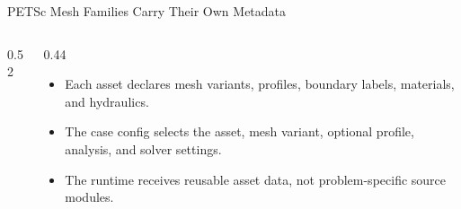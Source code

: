\documentclass[aspectratio=169,10pt]{beamer}
\begin{document}
\begin{frame}{PETSc Mesh Families Carry Their Own Metadata}
\small
\begin{columns}[T,totalwidth=\textwidth]
\begin{column}{0.52\textwidth}
\begin{pseudobox}
\\
\\
\\
\\
\\
\code{)}
\code{\}}
\end{pseudobox}
\end{column}
\begin{column}{0.44\textwidth}
\begin{softbox}
\begin{itemize}
  \item Each asset declares mesh variants, profiles, boundary labels, materials, and hydraulics.
  \item The case config selects the asset, mesh variant, optional profile, analysis, and solver settings.
  \item The runtime receives reusable asset data, not problem-specific source modules.
\end{itemize}
\end{softbox}
\end{column}
\end{columns}
\end{frame}
\end{document}
